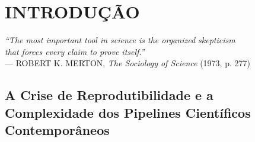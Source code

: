 % 

\chapter{INTRODUÇÃO}
\label{ch:introducao}

\begin{flushright}
\small\textit{``The most important tool in science is the organized skepticism\\that forces every claim to prove itself.''}\\
--- ROBERT K. MERTON, \textit{The Sociology of Science} (1973, p. 277)
\end{flushright}


\section{A Crise de Reprodutibilidade e a Complexidade dos Pipelines Científicos Contemporâneos}

